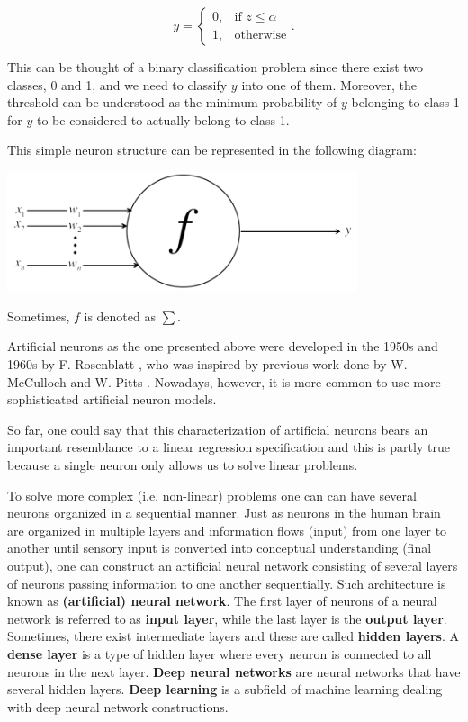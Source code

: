 \documentclass[11pt]{article}
\theoremstyle{definition}
\begin{document}
\begin{equation*}
    y = \begin{cases} 0, & \text{if }  z \leq \alpha \\ 1, & \text{otherwise} \end{cases}.
\end{equation*}

This can be thought of a binary classification problem since there exist two classes, 0 and 1, and we need to classify $y$ into one of them. Moreover, the threshold can be understood as the minimum probability of $y$ belonging to class 1 for $y$ to be considered to actually belong to class 1.  

This simple neuron structure can be represented in the following diagram:

\begin{center}
    \centering
    \includegraphics[width=\textwidth, height=3.5cm, keepaspectratio=true]{images/neuron.png}
    \label{fig:neuron}
\end{center}

Sometimes, $f$ is denoted as $\sum$.

Artificial neurons as the one presented above were developed in the 1950s and 1960s by F. Rosenblatt \cite{rosenblatt}, who was inspired by previous work done by W. McCulloch and W. Pitts \cite{McCulloch:Pitts}. Nowadays, however, it is more common to use more sophisticated artificial neuron models.

So far, one could say that this characterization of artificial neurons bears an important resemblance to a linear regression specification and this is partly true because a single neuron only allows us to solve linear problems. 

To solve more complex (i.e. non-linear) problems one can can have several neurons organized in a sequential manner. Just as neurons in the human brain are organized in multiple layers and information flows (input) from one layer to another until sensory input is converted into conceptual understanding (final output), one can construct an artificial neural network consisting of several layers of neurons passing information to one another sequentially. Such architecture is known as \textbf{(artificial) neural network}. The first layer of neurons of a neural network is referred to as \textbf{input layer}, while the last layer is the \textbf{output layer}. Sometimes, there exist intermediate layers and these are called \textbf{hidden layers}. A \textbf{dense layer} is a type of hidden layer where every neuron is connected to all neurons in the next layer. \textbf{Deep neural networks} are neural networks that have several hidden layers. \textbf{Deep learning} is a subfield of machine learning dealing with deep neural network constructions.
\end{document}
